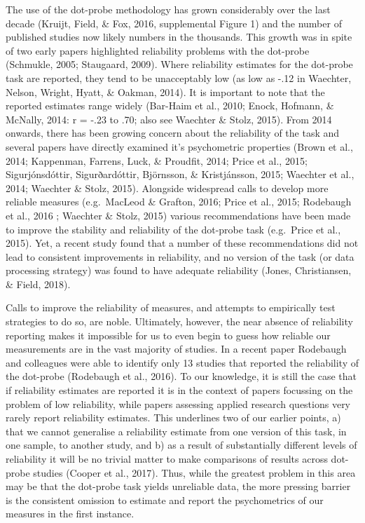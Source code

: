 \documentclass[english,,man,floatsintext]{apa6}
\begin{document}
The use of the dot-probe methodology has grown considerably over the last decade (Kruijt, Field, \& Fox, 2016, supplemental Figure 1) and the number of published studies now likely numbers in the thousands. This growth was in spite of two early papers highlighted reliability problems with the dot-probe (Schmukle, 2005; Staugaard, 2009). Where reliability estimates for the dot-probe task are reported, they tend to be unacceptably low (as low as -.12 in Waechter, Nelson, Wright, Hyatt, \& Oakman, 2014). It is important to note that the reported estimates range widely (Bar-Haim et al., 2010; Enock, Hofmann, \& McNally, 2014: r = -.23 to .70; also see Waechter \& Stolz, 2015). From 2014 onwards, there has been growing concern about the reliability of the task and several papers have directly examined it's psychometric properties (Brown et al., 2014; Kappenman, Farrens, Luck, \& Proudfit, 2014; Price et al., 2015; Sigurjónsdóttir, Sigurðardóttir, Björnsson, \& Kristjánsson, 2015; Waechter et al., 2014; Waechter \& Stolz, 2015). Alongside widespread calls to develop more reliable measures (e.g.~MacLeod \& Grafton, 2016; Price et al., 2015; Rodebaugh et al., 2016 ; Waechter \& Stolz, 2015) various recommendations have been made to improve the stability and reliability of the dot-probe task (e.g.~Price et al., 2015). Yet, a recent study found that a number of these recommendations did not lead to consistent improvements in reliability, and no version of the task (or data processing strategy) was found to have adequate reliability (Jones, Christiansen, \& Field, 2018).

Calls to improve the reliability of measures, and attempts to empirically test strategies to do so, are noble. Ultimately, however, the near absence of reliability reporting makes it impossible for us to even begin to guess how reliable our measurements are in the vast majority of studies. In a recent paper Rodebaugh and colleagues were able to identify only 13 studies that reported the reliability of the dot-probe (Rodebaugh et al., 2016). To our knowledge, it is still the case that if reliability estimates are reported it is in the context of papers focussing on the problem of low reliability, while papers assessing applied research questions very rarely report reliability estimates. This underlines two of our earlier points, a) that we cannot generalise a reliability estimate from one version of this task, in one sample, to another study, and b) as a result of substantially different levels of reliability it will be no trivial matter to make comparisons of results across dot-probe studies (Cooper et al., 2017). Thus, while the greatest problem in this area may be that the dot-probe task yields unreliable data, the more pressing barrier is the consistent omission to estimate and report the psychometrics of our measures in the first instance.
\end{document}
